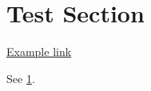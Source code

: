 \documentclass{scrartcl}
\begin{document}

\section{Test Section}\label{sec:test}

\href{https://example.com}{Example link}

See \cref{sec:test}.
\end{document}
